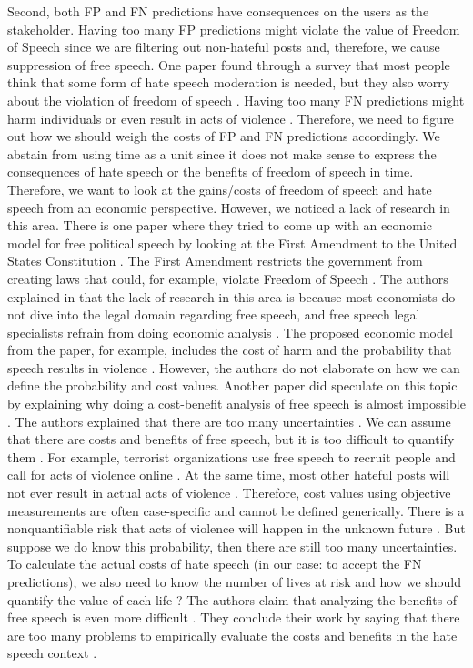 Second, both FP and FN predictions have consequences on the users as the stakeholder. Having too many FP predictions might violate the value of Freedom of Speech since we are filtering out non-hateful posts and, therefore, we cause suppression of free speech. One paper found through a survey that most people think that some form of hate speech moderation is needed, but they also worry about the violation of freedom of speech \citep{olteanu2017limits}. Having too many FN predictions might harm individuals or even result in acts of violence \citep{ecri-hate-speech-and-violence}. Therefore, we need to figure out how we should weigh the costs of FP and FN predictions accordingly. We abstain from using time as a unit since it does not make sense to express the consequences of hate speech or the benefits of freedom of speech in time. Therefore, we want to look at the gains/costs of freedom of speech and hate speech from an economic perspective. However, we noticed a lack of research in this area. There is one paper where they tried to come up with an economic model for free political speech by looking at the First Amendment to the United States Constitution \citep{posner1986free}. The First Amendment restricts the government from creating laws that could, for example, violate Freedom of Speech \citep{first-amendment-white-house}. The authors explained in \citet{posner1986free} that the lack of research in this area is because most economists do not dive into the legal domain regarding free speech, and free speech legal specialists refrain from doing economic analysis \citep{posner1986free}. The proposed economic model from the paper, for example, includes the cost of harm and the probability that speech results in violence \citep{posner1986free}. However, the authors do not elaborate on how we can define the probability and cost values. Another paper did speculate on this topic by explaining why doing a cost-benefit analysis of free speech is almost impossible \citep{sunstein2018does}. The authors explained that there are too many uncertainties \citep{sunstein2018does}. We can assume that there are costs and benefits of free speech, but it is too difficult to quantify them \citep{sunstein2018does}. For example, terrorist organizations use free speech to recruit people and call for acts of violence online \citep{sunstein2018does}. At the same time, most other hateful posts will not ever result in actual acts of violence \citep{sunstein2018does}. Therefore, cost values using objective measurements are often case-specific and cannot be defined generically. There is a nonquantifiable risk that acts of violence will happen in the unknown future \citep{sunstein2018does}. But suppose we do know this probability, then there are still too many uncertainties. To calculate the actual costs of hate speech (in our case: to accept the FN predictions), we also need to know the number of lives at risk and how we should quantify the value of each life \citep{sunstein2018does}? The authors claim that analyzing the benefits of free speech is even more difficult \citep{sunstein2018does}. They conclude their work by saying that there are too many problems to empirically evaluate the costs and benefits in the hate speech context \citep{sunstein2018does}.

